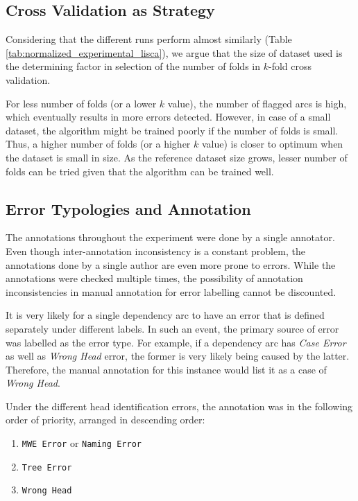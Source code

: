 \subsection{Cross Validation as Strategy}

Considering that the different runs perform almost similarly (Table \ref{tab:normalized_experimental_lisca}), we argue that the size of dataset used is the determining factor in selection of the number of folds in $k$-fold cross validation.

For less number of folds (or a lower $k$ value), the number of flagged arcs is high, which eventually results in more errors detected. However, in case of a small dataset, the algorithm might be trained poorly if the number of folds is small. Thus, a higher number of folds (or a higher $k$ value) is closer to optimum when the dataset is small in size. As the reference dataset size grows, lesser number of folds can be tried given that the algorithm can be trained well.

\subsection{Error Typologies and Annotation}

The annotations throughout the experiment were done by a single annotator. Even though inter-annotation inconsistency is a constant problem, the annotations done by a single author are even more prone to errors. While the annotations were checked multiple times, the possibility of annotation inconsistencies in manual annotation for error labelling cannot be discounted.

It is very likely for a single dependency arc to have an error that is defined separately under different labels. In such an event, the primary source of error was labelled as the error type. For example, if a dependency arc has \textit{Case Error} as well as \textit{Wrong Head} error, the former is very likely being caused by the latter. Therefore, the manual annotation for this instance would list it as a case of \textit{Wrong Head}.

Under the different head identification errors, the annotation was in the following order of priority, arranged in descending order:

\begin{enumerate}
    \item \texttt{MWE Error} or \texttt{Naming Error}
    \item \texttt{Tree Error}
    \item \texttt{Wrong Head}
\end{enumerate}

